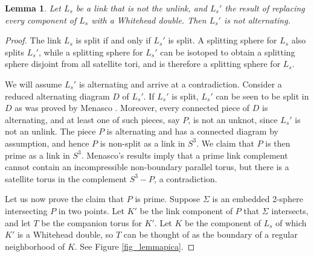 \documentclass[12pt]{amsart}
\newtheorem{lemma}[thm]{Lemma}
\theoremstyle{definition}
\theoremstyle{remark}
\begin{document}
\begin{lemma}
Let $L_s$ be a link that is not the unlink, and $L_s'$ the result of replacing every component of $L_s$ with a Whitehead double.
Then $L_s'$ is not alternating.
\label{lem_whitehead}
\end{lemma}
\begin{proof}
The link $L_s$ is split if and only if $L_s'$ is split.
A splitting sphere for $L_s$ also splits $L_s'$, while a splitting sphere for $L_s'$ can be isotoped to obtain a splitting sphere disjoint from all satellite tori, and is therefore a splitting sphere for $L_s$.

We will assume $L_s'$ is alternating and arrive at a contradiction.
Consider a reduced alternating diagram $D$ of $L_s'$.
If $L_s'$ is split, $L_s'$ can be seen to be split in $D$ as was proved by Menasco \cite{Menasco1}.
Moreover, every connected piece of $D$ is alternating, and at least one of such pieces, say $P$, is not an unknot, since $L_s'$ is not an unlink.
The piece $P$ is alternating and has a connected diagram by assumption, and hence $P$ is non-split as a link in $S^3$.
We claim that $P$ is then prime as a link in $S^3$.
Menasco's results \cite{Menasco1} imply that a prime link complement cannot contain an incompressible non-boundary parallel torus, but there is a satellite torus in the complement $S^3-P$, a contradiction.



Let us now prove the claim that $P$ is prime.
Suppose $\Sigma$ is an embedded 2-sphere intersecting $P$ in two points.
Let $K'$ be the link component of $P$ that $\Sigma$ intersects, and let $T$ be the companion torus for $K'$.
Let $K$ be the component of $L_s$ of which $K'$ is a Whitehead double, so $T$ can be thought of as the boundary of a regular neighborhood of $K$.
See Figure \ref{fig_lemmapica}.


\end{proof}
\end{document}
